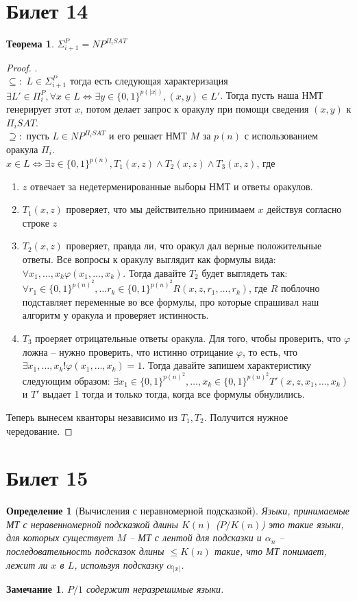 \documentclass[12pt, letterpaper]{article}
\newtheorem{theorem}{Теорема}[section]
\newtheorem{defi}{Определение}[section]
\newtheorem{note}{Замечание}[section]
\newcommand{\ph}{\varphi}
\begin{document}
\section{Билет 14}
\begin{theorem}
$\Sigma_{i+1}^P = NP^{\Pi_i SAT}$
\end{theorem}
\begin{proof}
.\\$\subseteq:$ $L \in \Sigma_{i+1}^P$ тогда есть следующая характеризация $\exists L' \in \Pi_i^P, \forall x \in L \Leftrightarrow \exists y \in \{0, 1\}^{p(|x|)}, (x, y) \in L'$. Тогда пусть наша НМТ генерирует этот $x$, потом делает запрос к оракулу при помощи сведения $(x, y)$ к $\Pi_i SAT$. \\
$\supseteq:$ пусть $L \in NP^{\Pi_i SAT}$ и его решает НМТ $M$ за $p(n)$ с использованием оракула $\Pi_i$. \\
$x \in L \Longleftrightarrow \exists z \in \{0,1\}^{p(n)}, T_1(x, z) \wedge T_2(x, z) \wedge T_3(x, z) $, где
\begin{enumerate}
\item $z$ отвечает за недетерменированные выборы НМТ и ответы оракулов.
\item $T_1(x, z)$ проверяет, что мы действительно принимаем $x$ действуя согласно строке $z$
\item $T_2(x, z)$ проверяет, правда ли, что оракул дал верные положительные ответы. Все вопросы к оракулу выглядит как формулы вида: $\forall x_1, \ldots, x_k \ph(x_1, \ldots, x_k)$. Тогда давайте $T_2$ будет выглядеть так: $\forall r_1 \in \{0,1\}^{p(n)^2}, \ldots r_k \in \{0, 1\}^{p(n)^2} R(x, z, r_1, \ldots, r_k)$, где $R$ поблочно подставляет переменные во все формулы, про которые спрашивал наш алгоритм у оракула и проверяет истинность.
\item $T_3$ проеряет отрицательные ответы оракула. Для того, чтобы проверить, что $\ph$ ложна -- нужно проверить, что истинно отрицание $\ph$, то есть, что $\exists x_1, \ldots, x_k !\ph(x_1, \ldots, x_k) = 1$. Тогда давайте запишем характеристику следующим образом: 
$\exists x_1 \in \{0,1\}^{p(n)^2}, \ldots, x_k \in \{0, 1\}^{p(n)^2} T'(x, z, x_1, \ldots, x_k)$ и $T'$ выдает 1 тогда и только тогда, когда все формулы обнулились. 
\end{enumerate}
Теперь вынесем кванторы независимо из $T_1, T_2$. Получится нужное чередование. 
\end{proof}

\section{Билет 15}
\begin{defi}[Вычисления с неравномерной подсказкой]
Языки, принимаемые МТ с неравенномерной подсказкой длины $K(n)$ ($P / K(n)$) это такие языки, для которых существует $M$ -- МТ с лентой для подсказки и $\alpha_n$ -- последовательность подсказок длины $\leq K(n)$ такие, что МТ понимает, лежит ли $x$ в $L$, используя подсказку $\alpha_{|x|}$.
\end{defi}
\begin{note}
$P/1$ содержит неразрешимые языки. 
\end{note}
\end{document}
